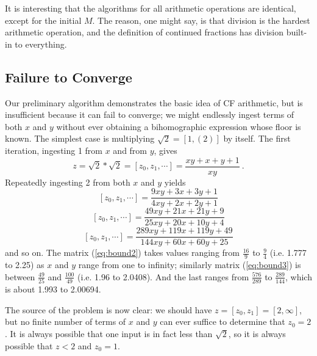 \documentclass[11pt, oneside]{amsart}   	%
\newcommand{\bihom}[8]{{\frac{#1 xy + #2 x + #3 y + #4}{#5 xy + #6 x + #7 y + #8}}}
\renewcommand{\:}{\negthickspace:\negthickspace}
\begin{document}
It is interesting that the algorithms for all arithmetic operations are identical, except for the initial $M$. The reason, one might say, is
that division is the hardest arithmetic operation, and the definition of continued fractions has division built-in to everything.



\subsection{Failure to Converge}\label{sec:FailToConverge}
Our preliminary algorithm demonstrates the basic idea of CF arithmetic, but is insufficient because it can fail to converge;
we might endlessly ingest terms of both $x$ and $y$ without ever obtaining a bihomographic expression whose floor is known. The
simplest case is multiplying $\sqrt{2} = [1,(2)]$ by itself. The first iteration, ingesting 1 from $x$ and from $y$, gives
\begin{equation*}
z = \sqrt{2}*\sqrt{2} = [z_0,z_1, \cdots] = \frac{xy+x+y+1}{xy} \ . %
\end{equation*}
Repeatedly ingesting 2 from both $x$ and $y$ yields
\begin{equation}\label{eq:bound2}
[z_0,z_1, \cdots]  =  \bihom{9}{3}{3}{1}{4}{2}{2}{1}
\end{equation}
\begin{equation}\label{eq:bound3}
[z_0,z_1, \cdots]  =  \bihom{49}{21}{21}{9}{25}{20}{10}{4}
\end{equation}
\begin{equation}\label{eq:bound4}
[z_0,z_1, \cdots]  =  \bihom{289}{119}{119}{49}{144}{60}{60}{25}
\end{equation}
and so on. The matrix (\ref{eq:bound2}) takes values ranging from $\frac{16}{9}$ to $\frac{9}{4}$ (i.e. 1.777 to 2.25)
as $x$ and $y$ range from one to infinity;
similarly matrix (\ref{eq:bound3}) is between $\frac{49}{25}$ and $\frac{100}{49}$ (i.e. 1.96 to 2.0408).
And the last ranges from $\frac{576}{289}$ to $\frac{289}{144}$, which is about 1.993 to 2.00694.

The source of the problem is now clear: we should have $z=[z_0,z_1]=[2,\infty]$, but no finite number of terms of $x$ and $y$ can ever suffice to determine that
$z_0=2$. It is always possible that one input is in fact less than $\sqrt{2}$, so it is always possible that $z<2$ and $z_0=1$.
\end{document}
